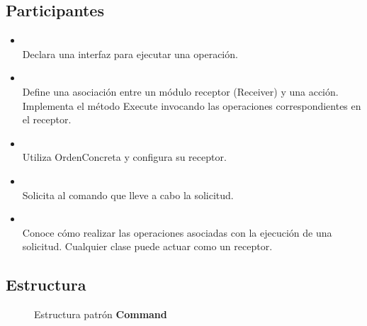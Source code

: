 \subsection*{Participantes}


\begin{itemize}
\item \Orden\\
Declara una interfaz para ejecutar una operación.

\item \OrdenConcreta\\
Define una asociación entre un módulo receptor (Receiver) y una acción.
Implementa el método Execute invocando las operaciones correspondientes en el receptor.

\item \Cliente\\
Utiliza OrdenConcreta y configura su receptor.

\item \Invocador\\
Solicita al comando que lleve a cabo la solicitud.

\item \Receptor\\
Conoce cómo realizar las operaciones asociadas con la ejecución de una solicitud. Cualquier clase puede actuar como un receptor.
\end{itemize}


\subsection*{Estructura}

\begin{figure}[H]
\caption{Estructura patrón \textbf{Command}}
\begin{center}
\end{center}
\end{figure}



